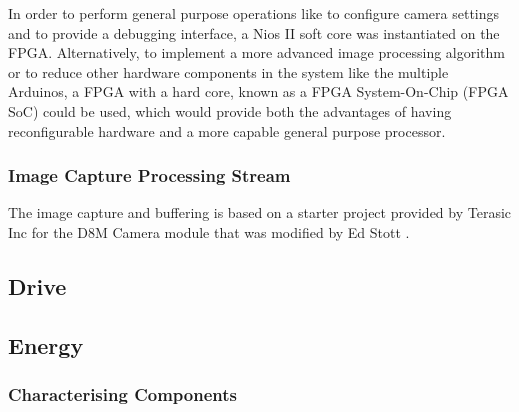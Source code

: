 \documentclass[a4paper]{article}
\begin{document}
In order to perform general purpose operations like
    to configure camera settings
    and to provide a debugging interface,
a Nios II soft core was instantiated on the FPGA. 
Alternatively, to implement a more advanced image processing algorithm
or to reduce other hardware components in the system like the multiple Arduinos, 
a FPGA with a hard core, 
known as a FPGA System-On-Chip (FPGA SoC) \cite{FPGASoC} could be used, 
which would provide both the advantages of having reconfigurable hardware 
and a more capable general purpose processor. 

\subsubsection{Image Capture Processing Stream}

The image capture and buffering is based on a starter project provided
by Terasic Inc for the D8M Camera module that was modified by Ed Stott 
\cite{EEE2Rover}. 



\subsection{Drive}

\subsection{Energy}
\begin{abstract}
    
\end{abstract}

\subsubsection{Characterising Components}
\end{document}
